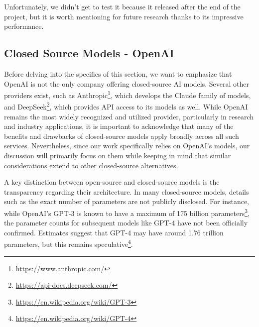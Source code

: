 Unfortunately, we didn't get to test it because it released after the end of the
project, but it is worth mentioning for future research thanks to its impressive
performance.

\subsection{Closed Source Models - OpenAI}
\label{sub:closed_source_models_openai}

Before delving into the specifics of this section, we want to emphasize that OpenAI
is not the only company offering closed-source AI models. Several other
providers exist, such as Anthropic\footnote{\url{https://www.anthropic.com/}}, which
develops the Claude family of models, and DeepSeek\footnote{\url{https://api-docs.deepseek.com/}},
which provides API access to its models as well. While OpenAI remains the most widely
recognized and utilized provider, particularly in research and industry
applications, it is important to acknowledge that many of the benefits and drawbacks
of closed-source models apply broadly across all such services. Nevertheless, since
our work specifically relies on OpenAI's models, our discussion will primarily
focus on them while keeping in mind that similar considerations extend to other
closed-source alternatives.

\vspace{2mm}

A key distinction between open-source and closed-source models is the transparency
regarding their architecture. In many closed-source models, details such as the exact
number of parameters are not publicly disclosed. For instance, while OpenAI's GPT-3\cite{brown2020languagemodelsfewshotlearners}
is known to have a maximum of 175 billion parameters\footnote{\url{https://en.wikipedia.org/wiki/GPT-3}},
the parameter counts for subsequent models like GPT-4\cite{openai2024gpt4technicalreport}
have not been officially confirmed. Estimates suggest that GPT-4 may have around
1.76 trillion parameters, but this remains speculative\footnote{\url{https://en.wikipedia.org/wiki/GPT-4}}.

